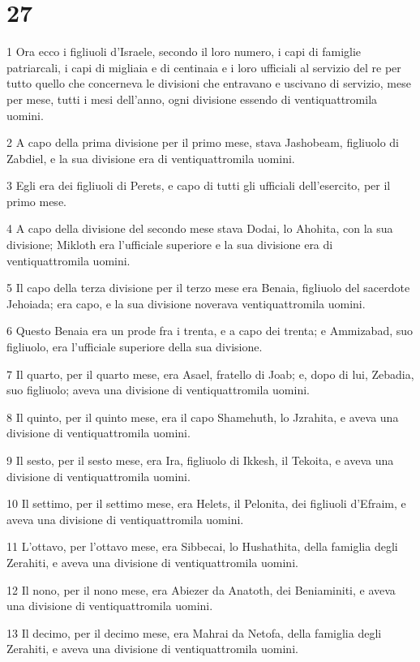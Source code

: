 \chapter{27}

\par 1 Ora ecco i figliuoli d'Israele, secondo il loro numero, i capi di famiglie patriarcali, i capi di migliaia e di centinaia e i loro ufficiali al servizio del re per tutto quello che concerneva le divisioni che entravano e uscivano di servizio, mese per mese, tutti i mesi dell'anno, ogni divisione essendo di ventiquattromila uomini.
\par 2 A capo della prima divisione per il primo mese, stava Jashobeam, figliuolo di Zabdiel, e la sua divisione era di ventiquattromila uomini.
\par 3 Egli era dei figliuoli di Perets, e capo di tutti gli ufficiali dell'esercito, per il primo mese.
\par 4 A capo della divisione del secondo mese stava Dodai, lo Ahohita, con la sua divisione; Mikloth era l'ufficiale superiore e la sua divisione era di ventiquattromila uomini.
\par 5 Il capo della terza divisione per il terzo mese era Benaia, figliuolo del sacerdote Jehoiada; era capo, e la sua divisione noverava ventiquattromila uomini.
\par 6 Questo Benaia era un prode fra i trenta, e a capo dei trenta; e Ammizabad, suo figliuolo, era l'ufficiale superiore della sua divisione.
\par 7 Il quarto, per il quarto mese, era Asael, fratello di Joab; e, dopo di lui, Zebadia, suo figliuolo; aveva una divisione di ventiquattromila uomini.
\par 8 Il quinto, per il quinto mese, era il capo Shamehuth, lo Jzrahita, e aveva una divisione di ventiquattromila uomini.
\par 9 Il sesto, per il sesto mese, era Ira, figliuolo di Ikkesh, il Tekoita, e aveva una divisione di ventiquattromila uomini.
\par 10 Il settimo, per il settimo mese, era Helets, il Pelonita, dei figliuoli d'Efraim, e aveva una divisione di ventiquattromila uomini.
\par 11 L'ottavo, per l'ottavo mese, era Sibbecai, lo Hushathita, della famiglia degli Zerahiti, e aveva una divisione di ventiquattromila uomini.
\par 12 Il nono, per il nono mese, era Abiezer da Anatoth, dei Beniaminiti, e aveva una divisione di ventiquattromila uomini.
\par 13 Il decimo, per il decimo mese, era Mahrai da Netofa, della famiglia degli Zerahiti, e aveva una divisione di ventiquattromila uomini.

